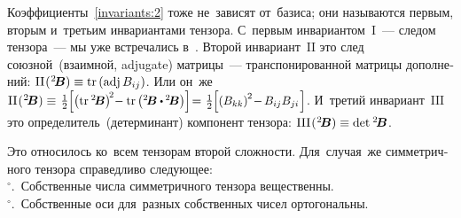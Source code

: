 \begin{otherlanguage}{russian}
Коэффициенты~\eqref{invariants:2} тоже не~зависят от~базиса; они называются первым, вторым и~третьим инвариантами тензора.
С~первым инвариантом~${\mathrm{I}}$~--- следом тензора~--- мы уже встречались в~.
Второй инвариант~${\mathrm{II}}$ это след союзной~(взаимной, adjugate) матрицы~--- транспонированной матрицы дополнений: ${\mathrm{II}\hspace{0.16ex}(\hspace{0.1ex}{^2\!\bm{B}}) \equiv \operatorname{tr} \left({\operatorname{adj}{B_{ij}}}\right)}$.
Или он~же \hbox{${\mathrm{II}\hspace{0.16ex}(\hspace{0.1ex}{^2\!\bm{B}}) \equiv \hspace{0.2ex} \textstyle \onehalf \hspace{-0.08ex} \scalebox{0.96}[0.96]{$\left[ \left(\operatorname{tr}\hspace{0.1ex} {^2\!\bm{B}}\right)^{\!2} \hspace{-0.5ex} - \operatorname{tr} \left( {^2\!\bm{B}} \dotp \hspace{-0.1ex} {^2\!\bm{B}} \right) \right]$} \hspace{-0.4ex} = \hspace{0.1ex} \textstyle \onehalf \hspace{-0.08ex} \scalebox{0.96}[0.96]{$\left[ \left( B_{kk} \right)^{\hspace{-0.1ex}2} \hspace{-0.4ex} - \hspace{-0.2ex} B_{ij} B_{ji} \hspace{0.2ex}\right]$}}$\hspace{-0.25ex}}.
И~третий инвариант~${\mathrm{III}}$ это определитель~(детерминант) компонент тензора: %
${\mathrm{III}\hspace{0.16ex}(\hspace{0.1ex}{^2\!\bm{B}}) \equiv \operatorname{det}\hspace{0.1ex} {^2\!\bm{B}}}$.

Это относилось ко~всем тензорам второй сложности. Для~случая~же симметричного тензора справедливо следующее:\\
$^{\circ}$\hspace{-1ex}.\, Собственные числа симметричного тензора вещественны.\\
$^{\circ}$\hspace{-1ex}.\, Собственные оси для~разных собственных чисел ортогональны.


\end{otherlanguage}
